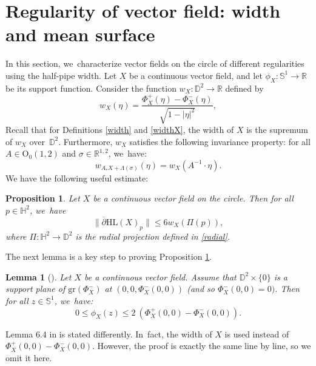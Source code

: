 \documentclass[JEP,XML,SOM,Unicode,NoEqCountersInSection, NoFloatCountersInSection,published]{cedram}
\theoremstyle{plain}
\newtheorem{prop}[cor]{Proposition}
\newtheorem{lemma}[cor]{Lemma}
\theoremstyle{definition}
\newcommand{\minko}{\mathbb{R}^{1,2}}
\begin{document}
\section{Regularity of vector field: width and mean surface}\label{sec8_reg}
In this section, we~characterize vector fields on the circle of different regularities using the half-pipe width. Let $X$ be a continuous vector field, and let $\phi_X: \mathbb{S}^1 \to \mathbb{R}$ be its support function. Consider the function $w_X: \mathbb{D}^2 \to \mathbb{R}$ defined by
\begin{equation}\label{w_xz}
w_X(\eta) = \frac{\Phi_X^+(\eta) - \Phi_X^-(\eta)}{\sqrt{1 - \lvert \eta \rvert^2}},
\end{equation}
Recall that for Definitions \ref{width} and \ref{widthX}, the width of $X$ is the supremum of $w_X$ over~$\mathbb{D}^2$. Furthermore, $w_X$ satisfies the following invariance property: for all $A \in \mathrm{O}_0(1,2)$ and $\sigma \in \minko$, we~have:
\begin{equation}\label{eq_width_equivariant}
w_{A_*X+\Lambda(\sigma)}(\eta)=w_{X}(A^{-1}\cdot \eta).
\end{equation}
We have the following useful estimate:
\begin{prop}\label{prop_d_bar_less_width}
Let $X$ be a continuous vector field on the circle. Then for all $p \in \mathbb{H}^2$, we~have
\begin{equation}\label{eqq_d_bar_less_width}
\lVert \overline{\partial}\mathrm{HL}(X)_p \rVert \leq 6 w_X(\Pi(p)),
\end{equation}
where $\Pi: \mathbb{H}^2 \to \mathbb{D}^2$ is the radial projection defined in \eqref{radial}.
\end{prop}

The next lemma is a key step to proving Proposition \ref{prop_d_bar_less_width}.

\begin{lemma}[{\cite[Lem.\,6.4]{diaf2023Infearth}}]\label{simple_resultt}
Let $X$ be a continuous vector field. Assume that $\mathbb{D}^2 \times \{0\}$ is a support plane of $\mathrm{gr}(\Phi_X^-)$ at $(0, 0, \Phi_X^{-}(0, 0))$ (and so $\Phi^-_X(0, 0) = 0)$. Then for all $z \in \mathbb{S}^1$, we~have:
\begin{equation}\label{eq_phi_less_width}
0\leq\phi_X(z)\leq 2 \ (\Phi_X^+(0,0)-\Phi_X^-(0,0)).
\end{equation}
\end{lemma}

Lemma 6.4 in \cite{diaf2023Infearth} is stated differently. In~fact, the width of \(X \) is used instead of \(\Phi_X^+(0,0) - \Phi_X^-(0,0) \). However, the proof is exactly the same line by line, so we omit it here.
\end{document}
